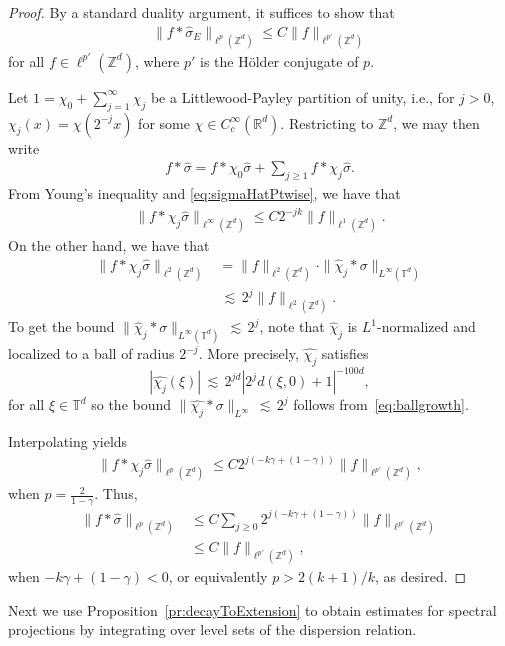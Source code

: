 \documentclass[11pt]{amsart}
\def\Real{{\mathbb R}}
\def\Z{{\mathbb{Z}}}
\def\bbT{{\mathbb{T}}}
\def\lsim{{\,\lesssim\,}}
\numberwithin{equation}{section}
\numberwithin{theorem}{section}
\begin{document}
\begin{proof}
By a standard duality argument, it suffices to show that
\begin{align*}
	\|f*\hat{\sigma}_E\|_{\ell^{p}(\Z^{d})}\leq C \|f\|_{\ell^{p'}(\Z^{d})}
\end{align*}
for all $f\in \ell^{p'}(\Z^{d})$, where $p'$ is the H\"{o}lder conjugate of $p$.\par
Let $1=\chi_0+\sum_{j=1}^{\infty}\chi_j$ be a Littlewood-Payley partition of unity, i.e., for $j>0 $, $\chi_j(x)=\chi(2^{-j}x)$ for some $\chi\in C^\infty_c(\Real^{d})$.
Restricting to $\Z^{d}$, we may then write
\begin{align*}
f*\hat{\sigma}=f*\chi_0\hat{\sigma}+\sum_{j\geq 1}f*\chi_j \hat{\sigma}.
\end{align*}
From Young's inequality and \eqref{eq:sigmaHatPtwise}, we have that
\begin{align*}
\|f*\chi_j\hat{\sigma}\|_{\ell^\infty(\Z^{d})}\leq C 2^{-j k}\|f\|_{\ell^1(\Z^{d})}.
\end{align*}
On the other hand, we have that
\begin{align*}
\|f*\chi_j \hat{\sigma}\|_{\ell^{2}(\Z^{d})}
&= \|f\|_{\ell^{2}(\Z^{d})}\cdot\|\hat{\chi}_j*\sigma\|_{L^\infty(\bbT^{d})} \\
&\lsim 2^j \|f\|_{\ell^{2}(\Z^{d})}.
\end{align*}
To get the bound $\|\hat{\chi}_j \ast \sigma\|_{L^\infty(\bbT^d)}\lsim 2^j$, note that $\hat{\chi}_j$
is $L^1$-normalized and localized to a ball of radius $2^{-j}$.  More precisely,
$\hat{\chi_j}$ satisfies
\[
|\hat{\chi_j}(\xi)| \lsim 2^{jd} |2^j d(\xi,0) + 1|^{-100d},
\]
for all $\xi\in\bbT^d$ so the bound $\|\hat{\chi_j}\ast \sigma\|_{L^\infty} \lsim 2^j$ follows from~\eqref{eq:ballgrowth}.

Interpolating yields
\begin{align*}
	\|f*\chi_j \hat{\sigma}\|_{\ell^{p}(\Z^{d})}\leq C 2^{j(-k\gamma +(1-\gamma))}\|f\|_{\ell^{p'}(\Z^{d})},
\end{align*}
when $p=\frac{2}{1-\gamma}$. Thus,
\begin{align*}
\|f*\hat{\sigma}\|_{\ell^{p}(\Z^{d})}&\leq C\sum_{j\geq 0}2^{j(-k\gamma +(1-\gamma))}\|f\|_{\ell^{p'}(\Z^{d})}\\
&\leq C \|f\|_{\ell^{p'}(\Z^{d})},
\end{align*}
when $-k\gamma+(1-\gamma)<0$, or equivalently $p>2(k+1)/k$, as desired.
\end{proof}

Next we use Proposition~\ref{pr:decayToExtension} to obtain estimates for spectral projections by
integrating over level sets of the dispersion relation.
\end{document}
